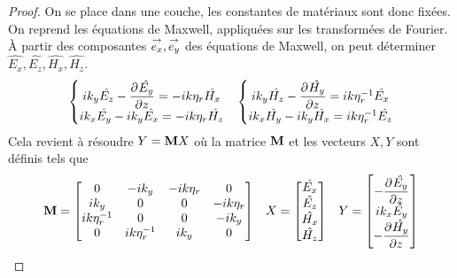       \begin{proof}
        On se place dans une couche, les constantes de matériaux sont donc fixées.
        On reprend les équations de Maxwell, appliquées sur les transformées de Fourier. À partir des composantes \(\vect{e_x},\vect{e_y}\) des équations de Maxwell, on peut déterminer \(\hat{E_x},\hat{E_z},\hat{H_x},\hat{H_z}\).
        \begin{align*}
            \left\lbrace
            \begin{matrix}
                ik_y \hat{E_z}  - \ddr{z}{\hat{E_y}} = -i k \eta_r  \hat{H_x}
                \\
                ik_x \hat{E_y} - ik_y \hat{E_x} = -i k \eta_r  \hat{H_z}
            \end{matrix}
            \right. 
            &&
            \left\lbrace
            \begin{matrix}
                ik_y \hat{H_z}  - \ddr{z}{\hat{H_y}} = i k \eta_r^{-1} \hat{E_x}
                \\
                ik_x \hat{H_y} - ik_y \hat{H_x} = i k \eta_r^{-1} \hat{E_z}
            \end{matrix}
            \right.
        \end{align*}
        Cela revient à résoudre \(Y = \mat{M}X\) où la matrice \(\mat{M}\) et les vecteurs \(X, Y\) sont définis tels que
        \begin{align*}
          \mat{M} =
          \begin{bmatrix}
          0 & -ik_y & -ik \eta_r & 0
          \\
          ik_y & 0 & 0 & -ik \eta_r
          \\
          ik \eta_r^{-1} & 0 & 0 & -ik_y
          \\
          0 & ik \eta_r^{-1} & ik_y & 0
          \end{bmatrix}
          &&
          X =
          \begin{bmatrix}
            \hat{E_x}\\
            \hat{E_z}\\
            \hat{H_x}\\
            \hat{H_z}
          \end{bmatrix}
          &&
          Y =
          \begin{bmatrix}
            -\ddr{z}{\hat{E_y}}\\
            ik_x\hat{E_y}\\
            -\ddr{z}{\hat{H_y}}\\

\end{bmatrix}
\end{align*}
\end{proof}
